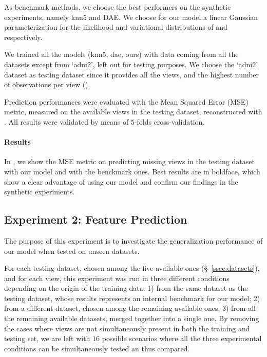 As benchmark methods, we choose the best performers on the synthetic experiments, namely knn5 and DAE.
We choose for our model a linear Gaussian parameterization for the likelihood and variational distributions of  and  respectively.

We trained all the models (knn5, dae, ours) with data coming from all the datasets except from `adni2', left out for testing purposes.
We choose the `adni2' dataset as testing dataset since it provides all the views, and the highest number of observations per view ().

Prediction performances were evaluated with the Mean Squared Error (MSE) metric, measured on the available views in the testing dataset, reconstructed with .
All results were validated by means of $5$-folds cross-validation.

\paragraph{Results}
In , we show the MSE metric on predicting missing views in the testing dataset with our model and with the benckmark ones.
Best results are in boldface, which show a clear advantage of using our model and confirm our findings in the synthetic experiments.

\subsection{Experiment 2: Feature Prediction}
\label{ssec:feats}


The purpose of this experiment is to investigate the generalization performance of our model when tested on unseen datasets.

For each testing dataset, chosen among the five available ones (\S~\ref{ssec:datasets}), and for each view, this experiment was run in three different conditions depending on the origin of the training data:
1) from the same dataset as the testing dataset, whose results represents an internal benchmark for our model;
2) from a different dataset, chosen among the remaining available ones;
3) from all the remaining available datasets, merged together into a single one.
By removing the cases where views are not simultaneously present in both the training and testing set,
we are left with $16$ possible scenarios where all the three experimental conditions can be simultaneously tested an thus compared.

